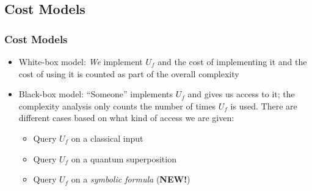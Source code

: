 \documentclass{beamer}
\begin{document}
\subsection[Cost Models]{Cost Models}

\begin{frame}
  \frametitle{Cost Models}
  \begin{itemize}
\item White-box model: \emph{We} implement $U_f$ and the cost of
  implementing it and the cost of using it is counted as part of the
  overall complexity
\item Black-box model: ``Someone'' implements $U_f$ and gives us
  access to it; the complexity analysis only counts the number of
  times $U_f$ is used. There are different cases based on what kind of
  access we are given:
  \begin{itemize}
    \item Query $U_f$ on a classical input 
    \item Query $U_f$ on a quantum superposition
    \item Query $U_f$ on a \emph{symbolic formula} (\textbf{NEW!})
  \end{itemize}
    \end{itemize}
  
\end{frame}
\end{document}
